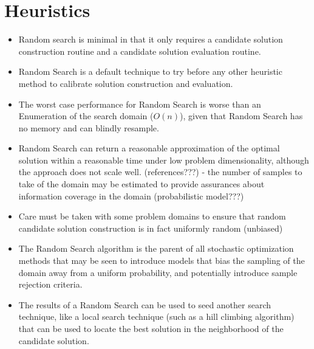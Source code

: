 \documentclass[a4paper, 11pt]{article}
\begin{document}
\section{Heuristics}
\label{sec:heuristics}
\begin{itemize}
	\item Random search is minimal in that it only requires a candidate solution construction routine and a candidate solution evaluation routine.
	\item Random Search is a default technique to try before any other heuristic method to calibrate solution construction and evaluation.
	\item The worst case performance for Random Search is worse than an Enumeration of the search domain ($O(n)$), given that Random Search has no memory and can blindly resample.
	\item Random Search can return a reasonable approximation of the optimal solution within a reasonable time under low problem dimensionality, although the approach does not scale well. (references???) - the number of samples to take of the domain may be estimated to provide assurances about information coverage in the domain (probabilistic model???)
	\item Care must be taken with some problem domains to ensure that random candidate solution construction is in fact uniformly random (unbiased)
	\item The Random Search algorithm is the parent of all stochastic optimization methods that may be seen to introduce models that bias the sampling of the domain away from a uniform probability, and potentially introduce sample rejection criteria.
	\item The results of a Random Search can be used to seed another search technique, like a local search technique (such as a hill climbing algorithm) that can be used to locate the best solution in the neighborhood of the candidate solution.
\end{itemize}
\end{document}
